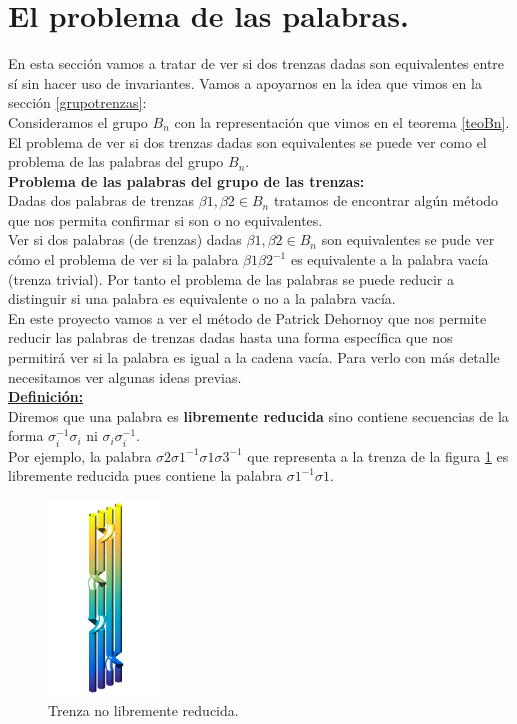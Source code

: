\section{El problema de las palabras.}
En esta sección vamos a tratar de ver si dos trenzas dadas son equivalentes entre sí sin hacer uso de invariantes. Vamos a apoyarnos en la idea que vimos en la sección \ref{grupotrenzas}:\\

Consideramos el grupo $ B_{n} $ con la representación que vimos en el teorema \ref{teoBn}. El problema de ver si dos trenzas dadas son equivalentes se puede ver como el problema de las palabras del grupo $ B_{n} $.\\

\textbf{Problema de las palabras del grupo de las trenzas:}\\
Dadas dos palabras de trenzas $\beta1, \beta2 \in B_{n}$ tratamos de encontrar algún método que nos permita confirmar si son o no equivalentes. \\

Ver si dos palabras (de trenzas) dadas $\beta1, \beta2 \in B_{n}$ son equivalentes se pude ver cómo el problema de ver si la palabra $\beta1\beta2^{-1}$ es equivalente a la palabra vacía (trenza trivial). Por tanto el problema de las palabras se puede reducir a distinguir si una palabra es equivalente o no a la palabra vacía. \\

En este proyecto vamos a ver el método de Patrick Dehornoy que nos permite reducir las palabras de trenzas dadas hasta una forma específica que nos permitirá ver si la palabra es igual a la cadena vacía. Para verlo con más detalle necesitamos ver algunas ideas previas.\\

\underline{\textbf{Definición:}}\\
Diremos que una palabra es \textbf{libremente reducida} sino contiene secuencias de la forma $\sigma_{i}^{-1}\sigma_{i} $ ni $\sigma_{i}\sigma_{i}^{-1}$.\\

Por ejemplo, la palabra $\sigma2\sigma1^{-1}\sigma1\sigma3^{-1}$ que representa a la trenza de la figura \ref{deh1} es libremente reducida pues contiene la palabra $\sigma1^{-1}\sigma1$.\\

	\begin{figure}[h!]
		\centering
		\includegraphics[width=3cm]{itrenzas/deh1.png}
		\caption{Trenza no libremente reducida.}
		\label{deh1} 
	\end{figure}

